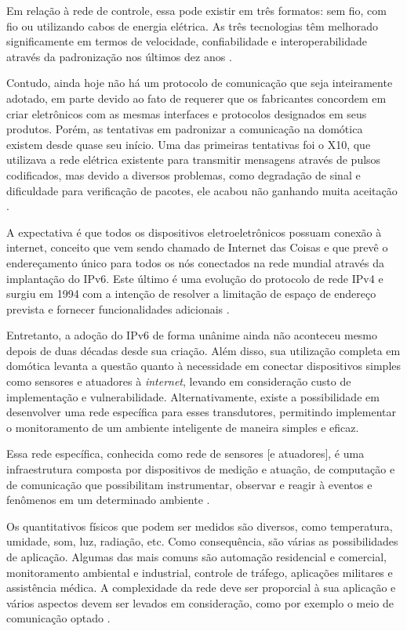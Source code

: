 Em relação à rede de controle, essa pode existir em três formatos: sem fio, com fio ou utilizando cabos de
energia elétrica. As três tecnologias têm melhorado significamente em termos de velocidade, confiabilidade e
interoperabilidade através da padronização nos últimos dez anos \cite{kyas2013}.

Contudo, ainda hoje não há um protocolo de comunicação que seja inteiramente adotado, em parte devido ao fato
de requerer que os fabricantes concordem em criar eletrônicos com as mesmas interfaces e protocolos designados
em seus produtos. Porém, as tentativas em padronizar a comunicação na domótica existem desde quase seu início.
Uma das primeiras tentativas foi o X10, que utilizava a rede elétrica existente para transmitir mensagens
através de pulsos codificados, mas devido a diversos problemas, como degradação de sinal e dificuldade para
verificação de pacotes, ele acabou não ganhando muita aceitação \cite{riley2012}.

A expectativa é que todos os dispositivos eletroeletrônicos possuam conexão à internet, conceito que vem sendo
chamado de Internet das Coisas e que prevê o endereçamento único para todos os nós conectados na rede mundial
através da implantação do IPv6. Este último é uma evolução do protocolo de rede IPv4 e surgiu em 1994 com a
intenção de resolver a limitação de espaço de endereço prevista e fornecer funcionalidades adicionais
\cite{hagen2002}.

Entretanto, a adoção do IPv6 de forma unânime ainda não aconteceu mesmo depois de duas décadas desde sua
criação. Além disso, sua utilização completa em domótica levanta a questão quanto à necessidade em conectar
dispositivos simples como sensores e atuadores à \textit{internet}, levando em consideração custo de
implementação e vulnerabilidade. Alternativamente, existe a possibilidade em desenvolver uma rede específica
para esses transdutores, permitindo implementar o monitoramento de um ambiente inteligente de maneira simples
e eficaz.

Essa rede específica, conhecida como rede de sensores [e atuadores], é uma infraestrutura composta por
dispositivos de medição e atuação, de computação e de comunicação que possibilitam instrumentar, observar e
reagir à eventos e fenômenos em um determinado ambiente \cite{sohraby_minoli_znati2007}.

Os quantitativos físicos que podem ser medidos são diversos, como temperatura, umidade, som, luz, radiação,
etc. Como consequência, são várias as possibilidades de aplicação. Algumas das mais comuns são automação
residencial e comercial, monitoramento ambiental e industrial, controle de tráfego, aplicações militares e
assistência médica. A complexidade da rede deve ser proporcial à sua aplicação e vários aspectos devem ser
levados em consideração, como por exemplo o meio de comunicação optado \cite{kuorilehto2007}.

